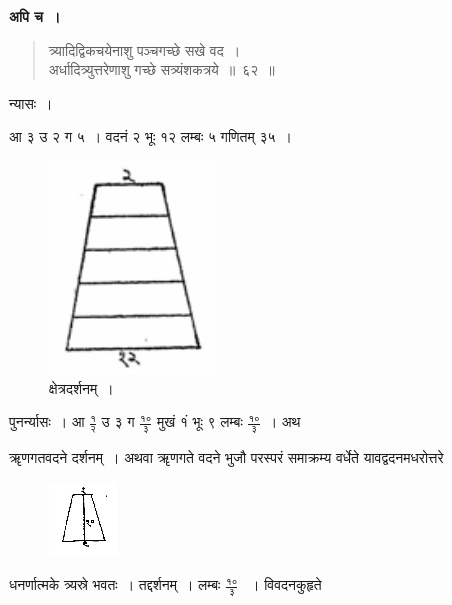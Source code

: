 \documentclass[11pt, openany]{book}
\begin{document}
\textbf{अपि च~।}

\begin{quote}
    \bqt 
त्र्यादिद्विकचयेनाशु पञ्चगच्छे सखे वद~।\\
अर्धादित्र्युत्तरेणाशु गच्छे सत्र्यंशकत्रये~॥~६२~॥
\end{quote}

न्यासः~। \\
\vspace{-3mm}

आ ३ उ २ ग ५~। वदनं २ भूः १२ लम्बः ५ गणितम् ३५~।

\begin{figure}[h!]
    \centering
  \captionsetup{labelformat=empty}
\caption{क्षेत्रदर्शनम्~।}
\vspace{-2mm}
    \includegraphics[scale=0.4]{graphics/capture87_2.png}
\end{figure}
\vspace{-2mm}

\noindent पुनर्न्यासः~। आ $\frac{\mbox{१}}{\mbox{२}}$ उ ३ ग $\frac{\mbox{१०}}{\mbox{३}}$ मुखं १ं भूः ९ लम्बः $\frac{\mbox{१०}}{\mbox{३}}$~। अथ

\newpage
\noindent ॠणगतवदने दर्शनम्~। अथवा ॠणगते वदने भुजौ परस्परं समाक्रम्य वर्धेते यावद्वदनमधरोत्तरे 
\vspace{-2mm}

\begin{figure}[h!]
    \centering
    \includegraphics[scale=0.85]{graphics/capture88.png}
\end{figure}
\vspace{-2mm}

\noindent धनर्णात्मके त्र्यस्रे भवतः~। तद्दर्शनम्~। लम्बः $\frac{\mbox{१०}}{\mbox{३}}$ ~। विवदनकुहृते
\vspace{-2mm}
\end{document}
